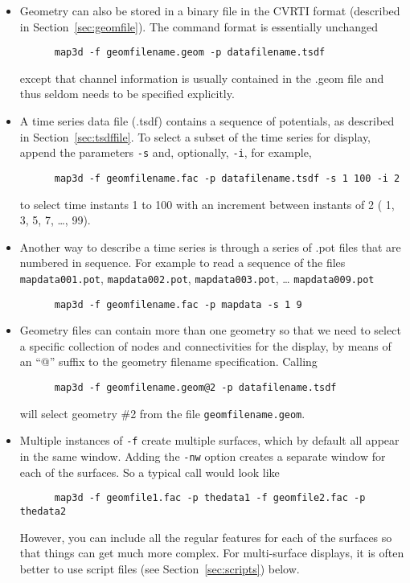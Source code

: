 \begin{itemize}
  \item Geometry can also be stored in a binary file in the CVRTI 
  format (described in Section~\ref{sec:geomfile}).  The command 
  format is essentially unchanged
  \begin{verbatim}
      map3d -f geomfilename.geom -p datafilename.tsdf
  \end{verbatim}
  \vspace{-.2in}
  except that channel information is usually contained in the .geom 
  file and thus seldom needs to be specified explicitly.
  
  \item A time series data file (.tsdf) contains a sequence of 
  potentials, as described in Section~\ref{sec:tsdffile}.
  To select a subset of the time series for display, append the 
  parameters \texttt{-s} and, optionally,  \texttt{-i}, for example,
  \begin{verbatim}
      map3d -f geomfilename.fac -p datafilename.tsdf -s 1 100 -i 2
  \end{verbatim}
  \vspace{-.2in}
  to select time instants 1 to 100 with an increment between instants 
  of 2 (\ie{} 1, 3, 5, 7, \ldots, 99).  

  \item Another way to describe a time series is through a series of .pot
  files that are numbered in sequence.  For example to read a sequence of
  the files \texttt{mapdata001.pot}, \texttt{mapdata002.pot},
  \texttt{mapdata003.pot}, \ldots{}  \texttt{mapdata009.pot}
  \begin{verbatim}
      map3d -f geomfilename.fac -p mapdata -s 1 9 
  \end{verbatim}
  
  \item Geometry files can contain more than one geometry 
  so that we need to select a specific collection of nodes and 
  connectivities for the display, by means of an ``@'' suffix to the 
  geometry filename specification.  Calling 
  \begin{verbatim}
      map3d -f geomfilename.geom@2 -p datafilename.tsdf
  \end{verbatim}
  \vspace{-.2in}
  will select geometry \#2 from the file \texttt{geomfilename.geom}.

  \item Multiple instances of \texttt{-f} create multiple surfaces, which by
  default all appear in the same  window.  Adding the \texttt{-nw} option
  creates a separate window for each of the surfaces.  So a typical call
  would look like
  \begin{verbatim}
      map3d -f geomfile1.fac -p thedata1 -f geomfile2.fac -p thedata2 
  \end{verbatim}
  However, you can include all the regular features for each of the
  surfaces so that things can get much more complex.  For multi-surface
  displays, it is often better to use script files (see
  Section~\ref{sec:scripts}) below.

\end{itemize}

